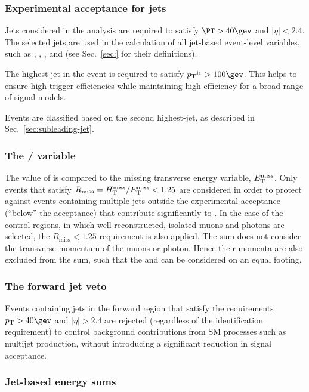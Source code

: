 \subsubsection{Experimental acceptance for jets}

Jets considered in the analysis are required to satisfy $\PT > 40\gev$
and $|\eta| < 2.4$. The selected jets are used in the calculation of
all jet-based event-level variables, such as \njet, \HT, \mht, and
\alphat (see Sec.~\ref{sec:} for their definitions).

The highest-\Pt jet in the event is required to satisfy $\Pt^{\mathrm
  j_1} > 100\gev$. This helps to ensure high trigger efficiencies
while maintaining high efficiency for a broad range of signal models.

Events are classified based on the second highest-\Pt jet, as
described in Sec.~\ref{sec:subleading-jet}.

\subsubsection{The \texorpdfstring{\mht/\met}{HTmiss/ETmiss} variable} 
\label{sec:mhtmet}

The value of \mht is compared to the missing transverse energy
variable, $\mbox{$E_\text{T}^{\rm miss}$}$. Only events that satisfy
$R_{\mathrm{miss}}=\mbox{$H_{\rm T}^{\rm miss}$}/\mbox{$E_\text{T}^{\rm miss}$} < 1.25$ are considered in order to
protect against events containing multiple jets outside the
experimental acceptance (\eg ``below'' the \Pt acceptance) that
contribute significantly to \mht. In the case of the control regions,
in which well-reconstructed, isolated muons and photons are selected,
the $R_{\mathrm{miss}} < 1.25$ requirement is also applied. The \mht
sum does not consider the transverse momentum of the muons or
photon. Hence their momenta are also excluded from the \met sum, such that the
\mht and \met can be considered on an equal footing.

\subsubsection{The forward jet veto} 

Events containing jets in the forward region that satisfy the
requirements $\Pt > 40\gev$ and $|\eta|>2.4$ are rejected (regardless
of the identification requirement) to control background contributions
from SM processes such as multijet production, without introducing a
significant reduction in signal acceptance.

\subsubsection{Jet-based energy sums}


